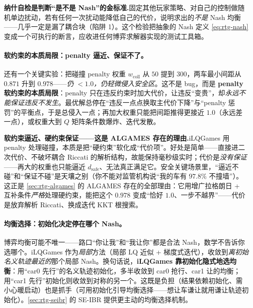 \begin{insight}
\textbf{纳什自检是判断“是不是 Nash”的金标准.}\;固定其他玩家策略、对自己的控制做随机单边扰动，若有任何一次扰动能降低自己的代价，说明求出的\emph{不是} Nash 均衡——几乎一定是漏了耦合块（陷阱 1）。这个检验把抽象的 Nash 定义 \cref{eq:rtg-nash} 变成一个可执行的断言，应收进任何博弈求解器实现的测试工具箱。
\end{insight}

\paragraph{软约束的本质局限：penalty 逼近、保证不了。}
还有一个关键实验：把碰撞 penalty 权重 $w_{\text{coll}}$ 从 $50$ 提到 $300$，两车最小间距从 $0.871$ 升到 $0.978$——\emph{仍 $<1.0$，仍轻微侵入安全区}\cite{fridovich2020efficient}。这不是 bug，而是 \textbf{penalty 软约束的本质局限}：penalty 只在违反约束时加大代价，让违反“变贵”，却\emph{永远不能保证违反不发生}。最优解总停在“违反一点点换取主代价下降”与“penalty 惩罚”的平衡点，于是总侵入一点；再加大权重只能把间距推得更接近 $1.0$（永远差一点），或权重大到 $Q$ 矩阵条件数爆炸、迭代发散。

\begin{insight}
\textbf{软约束逼近、硬约束保证——这是 ALGAMES 存在的理由.}\;iLQGames 用 penalty 处理碰撞，本质是把“硬约束”软化成“代价项”。好处是简单——直接进二次代价、不破坏耦合 Riccati 的解析结构，故能保持毫秒级实时；代价是\emph{没有保证}——再大的权重也只能逼近 $d_{\text{safe}}$、无法真正满足它。安全关键场景里，“逼近不碰”和“保证不碰”是天壤之别（你不能对监管机构说“我的车有 $97.8\%$ 不撞墙”）。这正是 \cref{sec:rtg-algames} 的 ALGAMES 存在的全部理由：它用增广拉格朗日 + 互补条件\emph{严格}处理硬约束，能把这个 $0.978$ 变成“恰好 $1.0$、一步不越界”——代价是放弃解析 Riccati、换成迭代 KKT 根搜索。
\end{insight}

\paragraph{均衡选择：初始化决定停在哪个 Nash。}
博弈均衡可能不唯一——路口“你让我”和“我让你”都是合法 Nash，数学不告诉你选哪个。iLQGames 作为\emph{局部}方法（局部 LQ 近似 + 梯度式迭代），收敛到\emph{离初始名义轨迹最近的}那个局部 Nash。换句话说，\textbf{iLQGames 靠初始化隐式地选均衡}：用“car0 先行”的名义轨迹初始化，多半收敛到 car0 抢行、car1 让的均衡；用“car1 先行”初始化则收敛到对称的另一个。这既是负担（结果依赖初始化、需小心暖启动）也是抓手（可用初始化引导均衡选择——想让车谦让就用谦让轨迹初始化）。\cref{sec:rtg-seibr} 的 SE-IBR 提供更主动的均衡选择机制。

